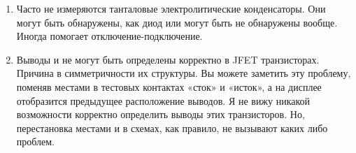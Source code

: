 \begin{enumerate}
\item Часто не измеряются танталовые электролитические конденсаторы. Они могут быть обнаружены, как диод или 
могут быть не обнаружены вообще. Иногда помогает отключение-подключение.

\item Выводы  и  не могут быть определены корректно в JFET транзисторах.
Причина в симметричности их структуры.
Вы можете заметить эту проблему, поменяв местами в тестовых контактах «сток» и «исток», а на дисплее отобразится
предыдущее расположение выводов. Я не вижу никакой возможности корректно определить выводы этих транзисторов.
Но, перестановка местами  и  в схемах, как правило, не вызывают каких либо проблем.   

\end{enumerate}
